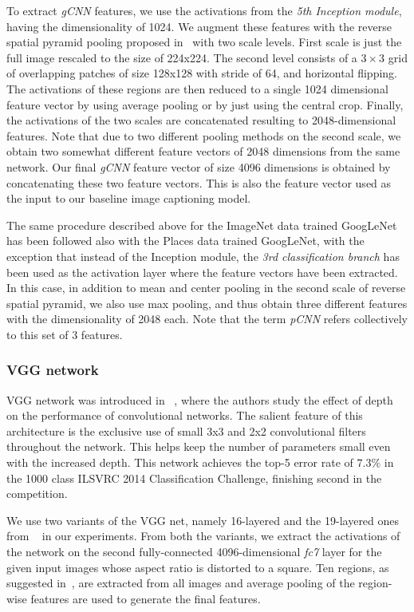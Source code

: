 To extract \emph{gCNN} features, we use the activations from the
\emph{5th Inception module}, having the dimensionality of 1024.
We augment these features with the reverse spatial pyramid pooling proposed
in~\cite{Gong2014} with two scale levels.
First scale is just the full image rescaled to the size of 224x224.
The second level consists of a $3\times3$ grid of overlapping patches of size
128x128 with stride of 64, and horizontal flipping.
The activations of these regions are then reduced to a single 1024 dimensional
feature vector by using average pooling or by just using the central crop.
Finally, the activations of the two scales are concatenated resulting to
2048-dimensional features.
Note that due to two different pooling methods on the second scale, we obtain
two somewhat different feature vectors of 2048 dimensions from the same network.
Our final \emph{gCNN} feature vector of size 4096 dimensions is obtained by
concatenating these two feature vectors.
This is also the feature vector used as the input to our baseline image
captioning model. 

The same procedure described above for the ImageNet data trained GoogLeNet has
been followed also with the Places data trained GoogLeNet, with the exception
that instead of the Inception module, the \emph{3rd classification branch} has
been used as the activation layer where the feature vectors have been extracted.
In this case, in addition to mean and center pooling in the second scale of
reverse spatial pyramid, we also use max pooling, and thus obtain three
different features with the dimensionality of 2048 each.
Note that the term \emph{pCNN} refers collectively to this set of 3 features.

\subsubsection{VGG network} 
VGG network was introduced in ~\cite{Simonyan14c}, where the authors study the
effect of depth on the performance of convolutional networks.
The salient feature of this architecture is the exclusive use of small 3x3 and
2x2 convolutional filters throughout the network.
This helps keep the number of parameters small even with the increased depth.
This network achieves the top-5 error rate of $7.3\%$ in the 1000 class ILSVRC
2014 Classification Challenge, finishing second in the competition.

We use two variants of the VGG net, namely 16-layered and the 19-layered ones
from ~\cite{Simonyan14c} in our experiments.
From both the variants, we extract the activations of the network on the second
fully-connected 4096-dimensional \emph{fc7} layer for the given input images
whose aspect ratio is distorted to a square.
Ten regions, as suggested in~\cite{Krizhevsky2012}, are extracted from all
images and average pooling of the region-wise features are used to generate the
final features.


